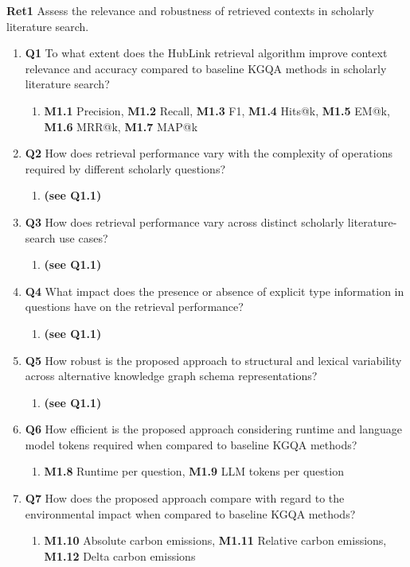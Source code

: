 \textbf{Ret1} Assess the relevance and robustness of retrieved contexts in scholarly literature search.
\begin{enumerate}[label={}]
    \item \textbf{Q1} To what extent does the HubLink retrieval algorithm improve context relevance and accuracy compared to baseline KGQA methods in scholarly literature search?
    \begin{enumerate}[label={}]
        \item \textbf{M1.1} Precision, \textbf{M1.2} Recall, \textbf{M1.3} F1, \textbf{M1.4} Hits@k, \textbf{M1.5} EM@k, \textbf{M1.6} MRR@k, \textbf{M1.7} MAP@k
    \end{enumerate}
    \item \textbf{Q2} How does retrieval performance vary with the complexity of operations required by different scholarly questions?
    \begin{enumerate}[label={}]
        \item \textbf{(see Q1.1)}
    \end{enumerate}
    \item \textbf{Q3} How does retrieval performance vary across distinct scholarly literature-search use cases?
    \begin{enumerate}[label={}]
        \item \textbf{(see Q1.1)}
    \end{enumerate}
    \item \textbf{Q4} What impact does the presence or absence of explicit type information in questions have on the retrieval performance?
    \begin{enumerate}[label={}]
        \item \textbf{(see Q1.1)}
    \end{enumerate}
    \item \textbf{Q5} How robust is the proposed approach to structural and lexical variability across alternative knowledge graph schema representations?
    \begin{enumerate}[label={}]
        \item \textbf{(see Q1.1)}
    \end{enumerate}
    \item \textbf{Q6} How efficient is the proposed approach considering runtime and language model tokens required when compared to baseline KGQA methods?
    \begin{enumerate}
        \item \textbf{M1.8} Runtime per question, \textbf{M1.9} LLM tokens per question
    \end{enumerate}
    \item \textbf{Q7} How does the proposed approach compare with regard to the environmental impact when compared to baseline KGQA methods?
    \begin{enumerate}
        \item \textbf{M1.10} Absolute carbon emissions, \textbf{M1.11} Relative carbon emissions, \textbf{M1.12} Delta carbon emissions
    \end{enumerate}
\end{enumerate}
